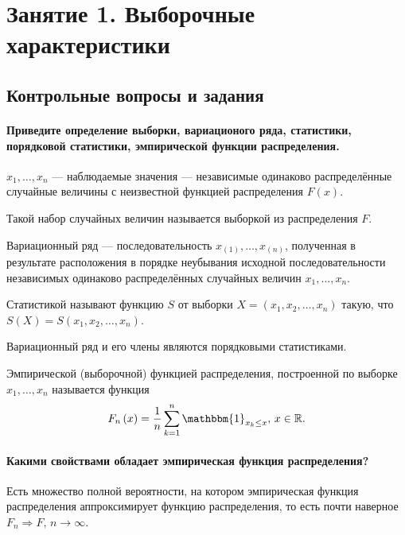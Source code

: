 \chapter*{Занятие 1. Выборочные характеристики}

\section*{Контрольные вопросы и задания}

\subsubsection*{Приведите определение выборки, вариационого ряда, статистики, порядковой статистики,
                эмпирической функции распределения.}

$x_1, \dotsc, x_n$ --- наблюдаемые значения ---
независимые одинаково распределённые случайные величины с неизвестной функцией распределения
$F \left( x \right) $.

Такой набор случайных величин называется выборкой из распределения $F$.

Вариационный ряд --- последовательность $x_{ \left( 1 \right) }, \dotsc, x_{ \left( n \right) }$,
полученная в результате расположения в порядке неубывания исходной последовательности
независимых одинаково распределённых случайных величин $x_1, \dotsc, x_n$.

Статистикой называют функцию $S$ от выборки $X = \left( x_1, x_2, \dotsc, x_n \right) $ такую,
что $S \left( X \right) = S \left( x_1, x_2, \dotsc, x_n \right) $.

Вариационный ряд и его члены являются порядковыми статистиками.

Эмпирической (выборочной) функцией распределения,
построенной по выборке $x_1, \dotsc, x_n$ называется функция
$$F_n \left( x \right) =
  \frac{1}{n} \sum \limits_{k = 1}^n \mathbbm{1}_{x_k \leq x}, \,
  x \in \mathbb{R}.$$

\subsubsection*{Какими свойствами обладает эмпирическая функция распределения?}

Есть множество полной вероятности,
на котором эмпирическая функция распределения аппроксимирует функцию распределения,
то есть почти наверное $F_n \Rightarrow F, \, n \to \infty $.

